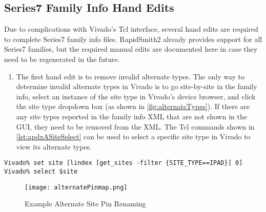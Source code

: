 \subsection{Series7 Family Info Hand Edits} \label{sec:series7HandEdits}
Due to complications with Vivado's Tcl interface,  several hand edits are
required to complete Series7 family info files. RapidSmith2 already
provides support for all Series7 families, but the required manual edits are
documented here in case they need to be regenerated in the future. 
    
\begin{enumerate}
  \item The first hand edit is to remove invalid alternate types. The only way
  to determine invalid alternate types in Vivado is to go site-by-site in the
  family info, select an instance of the site type in Vivado's device browser, and
  click the site type dropdown box (as shown in \autoref{fig:alternateTypes}).
  If there are any site types reported in the family info XML that are not
  shown in the GUI, they need to be removed from the XML. The Tcl commands
  shown in \autoref{lst:apdxASiteSelect} can be used to select a specific site
  type in Vivado to view its alternate types.

\end{enumerate}
 
\begin{lstlisting}[numbers=none, caption=Tcl commands to select a Vivado Site
object, label=lst:apdxASiteSelect]
Vivado% set site [lindex [get_sites -filter {SITE_TYPE==IPAD}] 0]
Vivado% select $site
\end{lstlisting}

\begin{figure}[b!]
  \centering
  \texttt{[image: alternatePinmap.png]}
  \caption{Example Alternate Site Pin Renaming}
  \label{fig:alternatePinmap}
\end{figure}

